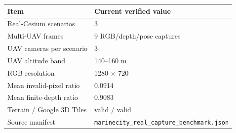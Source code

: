 \begin{tabular}{ll}
\toprule
Item & Current verified value \\
\midrule
Real-Cesium scenarios & 3 \\
Multi-UAV frames & 9 RGB/depth/pose captures \\
UAV cameras per scenario & 3 \\
UAV altitude band & 140--160 m \\
RGB resolution & 1280 $\times$ 720 \\
Mean invalid-pixel ratio & 0.0914 \\
Mean finite-depth ratio & 0.9083 \\
Terrain / Google 3D Tiles & valid / valid \\
Source manifest & \texttt{marinecity\_real\_capture\_benchmark.json} \\
\bottomrule
\end{tabular}
